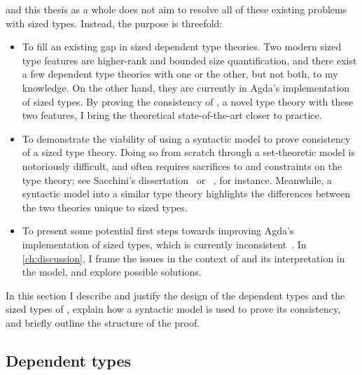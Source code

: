 \lang and this thesis as a whole does not aim to resolve
all of these existing problems with sized types.
Instead, the purpose is threefold:
%
\begin{itemize}
  \item To fill an existing gap in sized dependent type theories.
    Two modern sized type features are higher-rank and bounded size quantification,
    and there exist a few dependent type theories with one or the other,
    but not both, to my knowledge.
    On the other hand, they are currently in Agda's implementation of sized types.
    By proving the consistency of \lang, a novel type theory with these two features,
    I bring the theoretical state-of-the-art closer to practice.
  \item To demonstrate the viability of using a syntactic model to prove consistency
    of a sized type theory.
    Doing so from scratch through a set-theoretic model is notoriously difficult,
    and often requires sacrifices to and constraints on the type theory;
    see Sacchini's dissertation~\citep{CIC-hat-minus} or \CIChatstar~\citep{CIC-hat-star},
    for instance.
    Meanwhile, a syntactic model into a similar type theory
    highlights the differences between the two theories unique to sized types.
  \item To present some potential first steps towards improving Agda's implementation of sized types,
    which is currently inconsistent~\citep{infinity}.
    In \cref{ch:discussion}, I frame the issues in the context of \lang
    and its interpretation in the model,
    and explore possible solutions.
\end{itemize}

In this section I describe and justify the design of
the dependent types and the sized types of \lang,
explain how a syntactic model is used to prove its consistency,
and briefly outline the structure of the proof.

\subsection{Dependent types}

